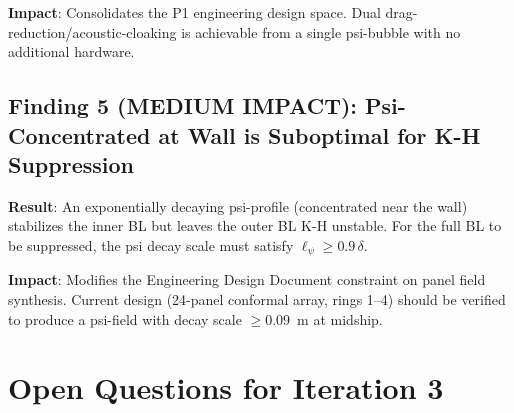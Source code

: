 \documentclass[11pt,twocolumn]{article}
\begin{document}
\textbf{Impact}: Consolidates the P1 engineering design space. Dual
drag-reduction/acoustic-cloaking is achievable from a single psi-bubble
with no additional hardware.

\subsection{Finding 5 (MEDIUM IMPACT): Psi-Concentrated at Wall is
Suboptimal for K-H Suppression}

\textbf{Result}: An exponentially decaying psi-profile (concentrated near
the wall) stabilizes the inner BL but leaves the outer BL K-H unstable.
For the full BL to be suppressed, the psi decay scale must satisfy
$\ell_\psi \geq 0.9\,\delta$.

\textbf{Impact}: Modifies the Engineering Design Document constraint on
panel field synthesis. Current design (24-panel conformal array, rings
1--4) should be verified to produce a psi-field with decay scale
$\geq 0.09$~m at midship.

\section{Open Questions for Iteration 3}
\label{sec:open}
\end{document}
